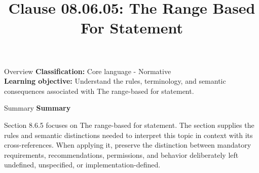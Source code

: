 \documentclass[10pt,letterpaper]{article}
\title{Clause 08.06.05: The Range Based For Statement}
\author{}
\date{}
\begin{document}
\maketitle
\begin{CornellOverviewBox}{Overview}
\textbf{Classification:} Core language - Normative\\[2pt]
\textbf{Learning objective:} Understand the rules, terminology, and semantic consequences associated with The range-based for statement.
\end{CornellOverviewBox}\begin{CornellSummaryBox}{Summary}
{\sffamily\bfseries\color{Accent} Summary}\par\vspace{3pt}Section 8.6.5 focuses on The range-based for statement. The section supplies the rules and semantic distinctions needed to interpret this topic in context with its cross-references. When applying it, preserve the distinction between mandatory requirements, recommendations, permissions, and behavior deliberately left undefined, unspecified, or implementation-defined.
\end{CornellSummaryBox}
\end{document}

